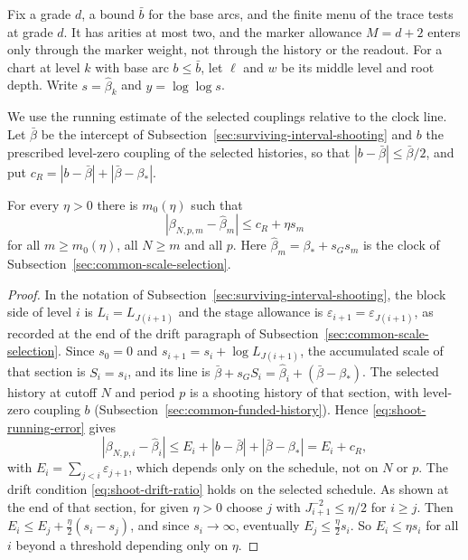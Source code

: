 Fix a grade $d$, a bound $\bar b$ for the base arcs, and the finite menu
of the trace tests at grade $d$. It has arities at most two, and the
marker allowance $M=d+2$ enters only through the marker weight, not
through the history or the readout. For a chart at level $k$ with base
arc $b\le\bar b$, let $\ell$ and $w$ be its middle level and root depth.
Write $s=\widehat\beta_k$ and $y=\log\log s$.

We use the running estimate of the selected couplings relative to the
clock line. Let $\bar\beta$ be the intercept of
Subsection~\ref{sec:surviving-interval-shooting} and $b$ the prescribed
level-zero coupling of the selected histories, so that
$|b-\bar\beta|\le\bar\beta/2$, and put $c_R=|b-\bar\beta|+|\bar\beta-\beta_*|$.

\begin{lemma}
\label{lem:rank-trace-running}
For every $\eta>0$ there is $m_0(\eta)$ such that
\[
 |\beta_{N,p,m}-\widehat\beta_m|\le c_R+\eta s_m
\]
for all $m\ge m_0(\eta)$, all $N\ge m$ and all $p$. Here
$\widehat\beta_m=\beta_*+s_Gs_m$ is the clock of
Subsection~\ref{sec:common-scale-selection}.
\end{lemma}
\begin{proof}
In the notation of Subsection~\ref{sec:surviving-interval-shooting}, the
block side of level $i$ is $L_i=L_{J(i+1)}$ and the stage allowance is
$\varepsilon_{i+1}=\varepsilon_{J(i+1)}$, as recorded at the end of
the drift paragraph of Subsection~\ref{sec:common-scale-selection}. Since
$s_0=0$ and $s_{i+1}=s_i+\log L_{J(i+1)}$, the accumulated scale of that
section is $S_i=s_i$, and its line is
$\bar\beta+s_GS_i=\widehat\beta_i+(\bar\beta-\beta_*)$. The selected
history at cutoff $N$ and period $p$ is a shooting history of that
section, with level-zero coupling $b$
(Subsection~\ref{sec:common-funded-history}). Hence
\eqref{eq:shoot-running-error} gives
\[
 |\beta_{N,p,i}-\widehat\beta_i|
   \le E_i+|b-\bar\beta|+|\bar\beta-\beta_*|=E_i+c_R ,
\]
with $E_i=\sum_{j<i}\varepsilon_{j+1}$, which depends only on the
schedule, not on $N$ or $p$. The drift condition
\eqref{eq:shoot-drift-ratio} holds on the selected schedule. As shown at
the end of that section, for given $\eta>0$ choose $j$ with
$J_{i+1}^{-2}\le\eta/2$ for $i\ge j$. Then
$E_i\le E_j+\tfrac\eta2(s_i-s_j)$, and since $s_i\to\infty$, eventually
$E_j\le\tfrac\eta2s_i$. So $E_i\le\eta s_i$ for all $i$ beyond a
threshold depending only on $\eta$.
\end{proof}

